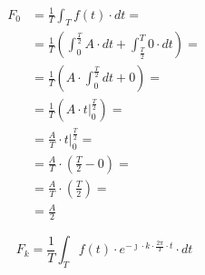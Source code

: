 \begin{task}
\begin{equation}
\begin{aligned}
F_0 &=\frac{1}{T}\int_{T}f(t) \cdot dt =\\
&=\frac{1}{T} \left( \int_{0}^{\frac{T}{2}} A \cdot dt + \int_{\frac{T}{2}}^{T} 0 \cdot dt \right ) = \\
&=\frac{1}{T} \left( A \cdot \int_{0}^{\frac{T}{2}} dt + 0 \right ) = \\
&=\frac{1}{T} \left( A \cdot \left. t\right |_{0}^{\frac{T}{2}} \right ) = \\
&=\frac{A}{T} \cdot \left. t\right |_{0}^{\frac{T}{2}} = \\
&=\frac{A}{T} \cdot \left( \frac{T}{2} - 0 \right ) = \\
&=\frac{A}{T} \cdot \left( \frac{T}{2} \right ) = \\
&=\frac{A}{2} 
\end{aligned}
\end{equation}




\begin{equation}
F_k=\frac{1}{T}\int_{T}f(t) \cdot e^{-\jmath \cdot k \cdot \frac{2\pi}{T} \cdot t} \cdot dt
\end{equation}



\end{task}
